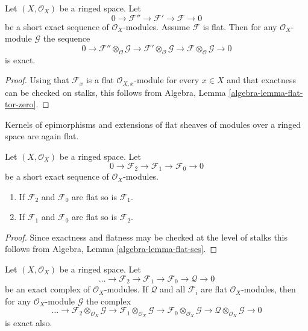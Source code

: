\begin{lemma}
\label{lemma-flat-tor-zero}
Let $(X, \mathcal{O}_X)$ be a ringed space.
Let
$$
0 \to \mathcal{F}'' \to \mathcal{F}' \to \mathcal{F} \to 0
$$
be a short exact sequence of $\mathcal{O}_X$-modules.
Assume $\mathcal{F}$ is flat. Then for any $\mathcal{O}_X$-module
$\mathcal{G}$ the sequence
$$
0 \to
\mathcal{F}'' \otimes_\mathcal{O} \mathcal{G} \to
\mathcal{F}' \otimes_\mathcal{O} \mathcal{G} \to
\mathcal{F} \otimes_\mathcal{O} \mathcal{G} \to 0
$$
is exact.
\end{lemma}

\begin{proof}
Using that $\mathcal{F}_x$ is a flat $\mathcal{O}_{X, x}$-module
for every $x \in X$ and that exactness can be checked on stalks, this
follows from
Algebra, Lemma \ref{algebra-lemma-flat-tor-zero}.
\end{proof}

\begin{lemma}
\label{lemma-flat-ses}
\begin{slogan}
Kernels of epimorphisms and extensions of flat sheaves of modules over
a ringed space are again flat.
\end{slogan}
Let $(X, \mathcal{O}_X)$ be a ringed space.
Let
$$
0 \to
\mathcal{F}_2 \to
\mathcal{F}_1 \to
\mathcal{F}_0 \to 0
$$
be a short exact sequence of $\mathcal{O}_X$-modules.
\begin{enumerate}
\item If $\mathcal{F}_2$ and $\mathcal{F}_0$ are flat so is
$\mathcal{F}_1$.
\item If $\mathcal{F}_1$ and $\mathcal{F}_0$ are flat so is
$\mathcal{F}_2$.
\end{enumerate}
\end{lemma}

\begin{proof}
Since exactness and flatness may be checked at the level of stalks
this follows from
Algebra, Lemma \ref{algebra-lemma-flat-ses}.
\end{proof}

\begin{lemma}
\label{lemma-flat-resolution-of-flat}
Let $(X, \mathcal{O}_X)$ be a ringed space.
Let
$$
\ldots \to
\mathcal{F}_2 \to
\mathcal{F}_1 \to
\mathcal{F}_0 \to
\mathcal{Q} \to 0
$$
be an exact complex of $\mathcal{O}_X$-modules.
If $\mathcal{Q}$ and all $\mathcal{F}_i$ are flat $\mathcal{O}_X$-modules,
then for any $\mathcal{O}_X$-module $\mathcal{G}$ the complex
$$
\ldots \to
\mathcal{F}_2 \otimes_{\mathcal{O}_X} \mathcal{G} \to
\mathcal{F}_1 \otimes_{\mathcal{O}_X} \mathcal{G} \to
\mathcal{F}_0 \otimes_{\mathcal{O}_X} \mathcal{G} \to
\mathcal{Q} \otimes_{\mathcal{O}_X} \mathcal{G} \to 0
$$
is exact also.
\end{lemma}

